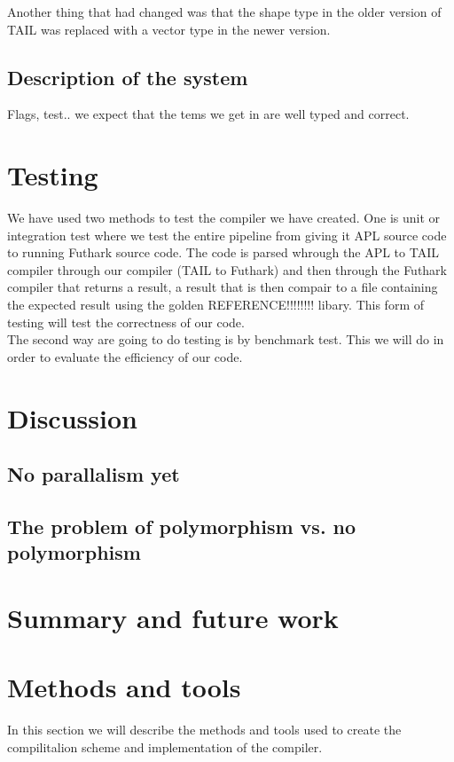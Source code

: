 \documentclass[11pt]{article}
\begin{document}
Another thing that had changed was that the shape type in the older version of TAIL was replaced with a vector type in the newer version.\\

\subsection{Description of the system}
Flags, test..
we expect that the tems we get in are well typed and correct. 

\section{Testing}
We have used two methods to test the compiler we have created. One is unit or integration test where we test the entire pipeline from giving it APL source code to running Futhark source code. The code is parsed whrough the APL to TAIL compiler \cite{ElsmanDybdal:Array:2014} through our compiler (TAIL to Futhark) and then through the Futhark compiler \cite{TroelsHenriksen} that returns a result, a result that is then compair to a file containing the expected result using the golden REFERENCE!!!!!!!! %
libary. This form of testing will test the correctness of our code. \\

The second way are going to do testing is by benchmark test. This we will do in order to evaluate the efficiency of our code. 

\section{Discussion}

\subsection{No parallalism yet}

\subsection{The problem of polymorphism vs. no polymorphism}

\section{Summary and future work}

\section{Methods and tools}
In this section we will describe the methods and tools used to create the compilitalion scheme and implementation of the  compiler. 
\end{document}
